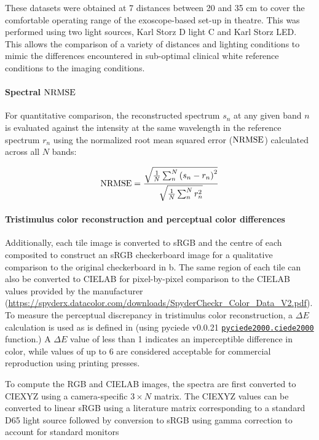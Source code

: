 These datasets were obtained at 7 distances between 20 and 35 cm to cover the comfortable operating range of the exoscope-based set-up in theatre. This was performed using two light sources, Karl Storz D light C and Karl Storz LED. This allows the comparison of a variety of distances and lighting conditions to mimic the differences encountered in sub-optimal clinical white reference conditions to the imaging conditions.

%

\paragraph{Spectral $\operatorname{NRMSE}$}
For quantitative comparison, the reconstructed spectrum $s_n$ at any given band $n$ is evaluated against the intensity at the same wavelength in the reference spectrum $r_n$ using the normalized root mean squared error ($\operatorname{NRMSE}$) calculated across all $N$ bands:
%
\begin{linenomath*}
\begin{equation}
    \operatorname{NRMSE} = \frac{\sqrt{\frac{1}{N}\sum_n^N\left(s_n - r_n\right)^2}}{\sqrt{\frac{1}{N}\sum_n^N r^2_n}}
\label{eq:normRMSE}
\end{equation}
\end{linenomath*}

\paragraph{Tristimulus color reconstruction and perceptual color differences}
Additionally, each tile image is converted to sRGB and the centre of each composited to construct an sRGB checkerboard image for a qualitative comparison to the original checkerboard in b. The same region of each tile can also be converted to CIELAB for pixel-by-pixel comparison to the CIELAB values provided by the manufacturer (\url{https://spyderx.datacolor.com/downloads/SpyderCheckr_Color_Data_V2.pdf}).
%
To measure the perceptual discrepancy in tristimulus color reconstruction, a $\Delta E$ calculation
%
is used as is defined in \cite{Sharma2005}
(using pyciede v0.0.21 \newline \href{https://pypi.org/project/pyciede2000/}{ \texttt{pyciede2000.ciede2000}} function.) A $\Delta E$ value of less than 1 indicates an imperceptible difference in color, while values of up to 6 are considered acceptable for commercial reproduction using printing presses. 
% 
% 
%  
%    
% 
% 
% 

To compute the RGB and CIELAB images, the spectra are first converted to CIEXYZ \cite{Smith1931} using a camera-specific $3 \times N$ matrix.
%
%
%
%  
%
%
%
The CIEXYZ values can be converted to linear sRGB using a literature matrix corresponding to a standard D65 light source
%
followed by conversion to sRGB using gamma correction to account for standard monitors
%
\cite{Magnusson2020,Reinhard}
% 
% 
% 
%
%
%
%
%
% 
% 
% 
% 
% 
% 
%

